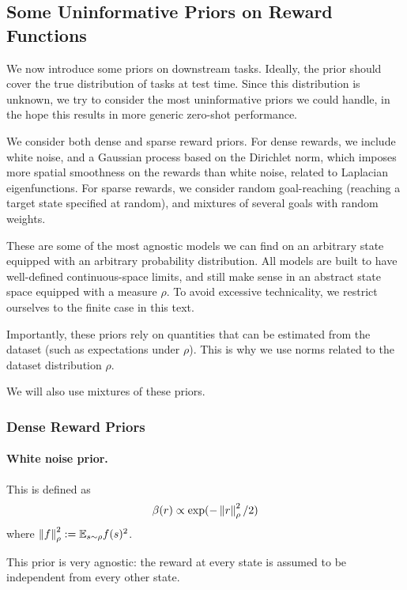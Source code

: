 \documentclass[11pt,a4paper]{article}
\begin{document}
\subsection{Some Uninformative Priors on Reward Functions}
\label{sec:priors}

We now introduce some priors on downstream tasks. Ideally, the prior
should cover the true distribution of tasks at test time.
Since this distribution is unknown, we try to consider the most
uninformative priors we could handle, in the hope this results in more
generic zero-shot performance.

We consider both dense and sparse reward priors. For dense rewards, we
include white noise, and a Gaussian process based on the Dirichlet norm,
which imposes more spatial smoothness on the rewards than white noise,
related to Laplacian eigenfunctions. For sparse rewards, we consider
random goal-reaching (reaching a target state specified at random), and
mixtures of several goals with random weights.

These are some of the most agnostic models we can find on an arbitrary
state equipped with an arbitrary probability distribution. All models are
built to have well-defined continuous-space limits, and still make sense
in an abstract state space equipped with a measure $\rho$. To avoid
excessive technicality, we restrict ourselves to the finite case in this
text.

Importantly, these priors rely on quantities that can be estimated from
the dataset (such as expectations under $\rho$). This is why we use
norms related to the dataset distribution $\rho$.

We will also use mixtures of these priors.

\subsubsection{Dense Reward Priors}

\paragraph{White noise prior.} This is defined as 
\begin{equation}
\beta(r)\propto
\exp(-\left\lVert r\right\rVert^2_\rho/2)
\end{equation}
where $\left\lVert f\right\rVert^2_\rho\mathrel{\mathop{:}}= \mathbb{E}_{s\sim \rho}
f(s)^2$.

This prior is very agnostic: the reward at every state is assumed to be
independent from every other state.
\end{document}

